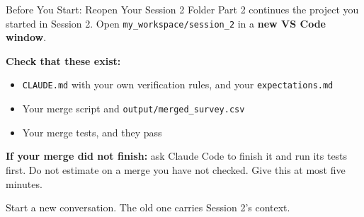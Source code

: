 \documentclass[aspectratio=169, 11pt]{beamer}
\begin{document}

\begin{frame}{Before You Start: Reopen Your Session 2 Folder}
  Part 2 continues the project you started in Session 2. Open \texttt{my\_workspace/session\_2} in a \textbf{new VS Code window}.

  \vspace{0.5em}
  \textbf{Check that these exist:}
  \begin{itemize}
    \item \texttt{CLAUDE.md} with your own verification rules, and your \texttt{expectations.md}
    \item Your merge script and \texttt{output/merged\_survey.csv}
    \item Your merge tests, and they pass
  \end{itemize}

  \vspace{0.5em}
  \textbf{If your merge did not finish:} ask Claude Code to finish it and run its tests first. Do not estimate on a merge you have not checked. Give this at most five minutes.

  \vspace{0.5em}
  \alert{Start a new conversation. The old one carries Session 2's context.}
\end{frame}
\end{document}
